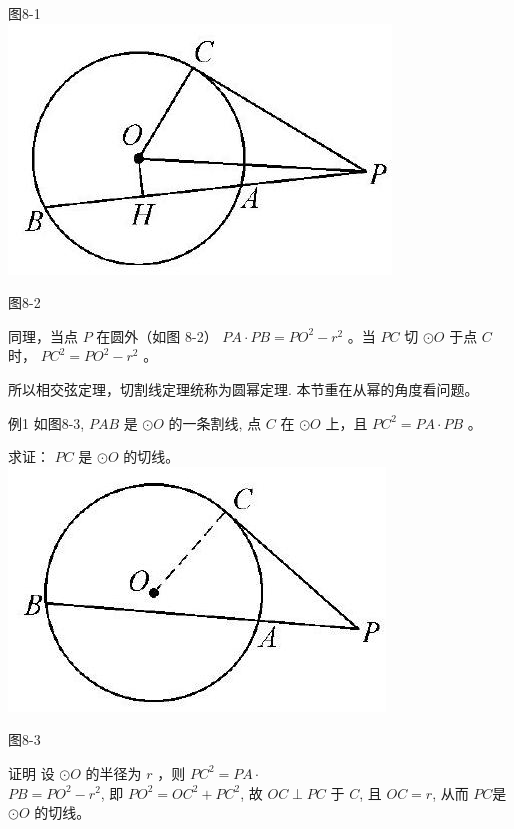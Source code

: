 \documentclass[10pt]{article}
\begin{document}
图8-1\\
\includegraphics[max width=\textwidth, center]{2024_10_30_66b8e5e701da2093c133g-058(2)}

图8-2

同理，当点 $P$ 在圆外（如图 8-2） $P A \cdot P B=P O^{2}-r^{2}$ 。当 $P C$ 切 $\odot O$ 于点 $C$ 时， $P C^{2}=P O^{2}-r^{2}$ 。

所以相交弦定理，切割线定理统称为圆幂定理. 本节重在从幂的角度看问题。

例1 如图8-3, $P A B$ 是 $\odot O$ 的一条割线, 点 $C$ 在 $\odot O$ 上，且 $P C^{2}=P A \cdot P B$ 。

求证： $P C$ 是 $\odot O$ 的切线。\\
\includegraphics[max width=\textwidth, center]{2024_10_30_66b8e5e701da2093c133g-058(1)}

图8-3

证明 设 $\odot O$ 的半径为 $r$ ，则 $P C^{2}=P A \cdot$\\
$P B=P O^{2}-r^{2}$, 即 $P O^{2}=O C^{2}+P C^{2}$, 故 $O C \perp P C$ 于 $C$, 且 $O C=r$, 从而 $P C$是 $\odot O$ 的切线。
\end{document}

